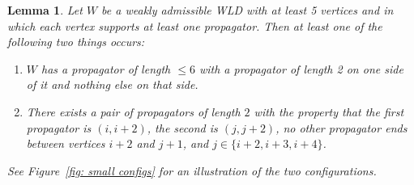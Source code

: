\documentclass[11pt]{article}
\newtheorem{lem}[thm]{Lemma}
\theoremstyle{remark}
\theoremstyle{definition}
\begin{document}
\begin{lem}\label{lem sian}
  Let $W$ be a weakly admissible WLD with at least 5 vertices and in which each vertex supports at least one propagator.  Then at least one of the following two things occurs:
  \begin{enumerate}
    \item $W$ has a propagator of length $\leq 6$ with a propagator of length 2 on one side of it and nothing else on that side.\label{item big and 2}
    \item There exists a pair of propagators of length $2$ with the property that the first propagator is $(i, i+2)$, the second is $(j, j+2)$, no other propagator ends between vertices $i+2$ and $j+1$, and $j\in\{i+2, i+3, i+4\}$.\label{item pair of 2s}
  \end{enumerate}
See Figure~\ref{fig: small configs} for an illustration of the two configurations.
\end{lem}
\end{document}
